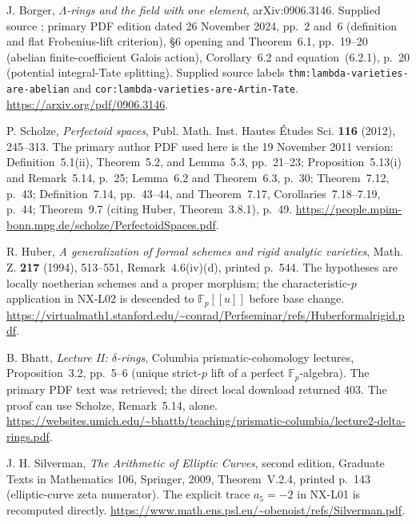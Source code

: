  J. Borger, \emph{$\Lambda$-rings and the field with one element},
arXiv:0906.3146. Supplied source
;
primary PDF edition dated 26 November 2024, pp.~2 and~6 (definition and flat
Frobenius-lift criterion), \S6 opening and Theorem~6.1, pp.~19--20
(abelian finite-coefficient Galois action), Corollary~6.2 and equation~(6.2.1),
p.~20 (potential integral-Tate splitting). Supplied source labels
\texttt{thm:lambda-varieties-are-abelian} and
\texttt{cor:lambda-varieties-are-Artin-Tate}.
\url{https://arxiv.org/pdf/0906.3146}.

 P. Scholze, \emph{Perfectoid spaces},
Publ. Math. Inst. Hautes \'Etudes Sci. \textbf{116} (2012), 245--313.
The primary author PDF used here is the 19 November 2011 version:
Definition~5.1(ii), Theorem~5.2, and Lemma~5.3, pp.~21--23;
Proposition~5.13(i) and Remark~5.14, p.~25;
Lemma~6.2 and Theorem~6.3, p.~30;
Theorem~7.12, p.~43;
Definition~7.14, pp.~43--44, and Theorem~7.17, Corollaries~7.18--7.19,
p.~44;
Theorem~9.7 (citing Huber, Theorem~3.8.1), p.~49.
\url{https://people.mpim-bonn.mpg.de/scholze/PerfectoidSpaces.pdf}.

 R. Huber, \emph{A generalization of formal schemes and rigid
analytic varieties}, Math. Z. \textbf{217} (1994), 513--551,
Remark~4.6(iv)(d), printed p.~544. The hypotheses are locally noetherian
schemes and a proper morphism; the characteristic-$p$ application in NX-L02
is descended to $\mathbb F_p[[u]]$ before base change.
\url{https://virtualmath1.stanford.edu/~conrad/Perfseminar/refs/Huberformalrigid.pdf}.

 B. Bhatt, \emph{Lecture II: $\delta$-rings},
Columbia prismatic-cohomology lectures, Proposition~3.2, pp.~5--6
(unique strict-$p$ lift of a perfect $\mathbb F_p$-algebra).
The primary PDF text was retrieved; the direct local download returned 403.
The proof can use Scholze, Remark~5.14, alone.
\url{https://websites.umich.edu/~bhattb/teaching/prismatic-columbia/lecture2-delta-rings.pdf}.

 J. H. Silverman, \emph{The Arithmetic of Elliptic Curves},
second edition, Graduate Texts in Mathematics 106, Springer, 2009,
Theorem~V.2.4, printed p.~143 (elliptic-curve zeta numerator).
The explicit trace $a_5=-2$ in NX-L01 is recomputed directly.
\url{https://www.math.ens.psl.eu/~obenoist/refs/Silverman.pdf}.

